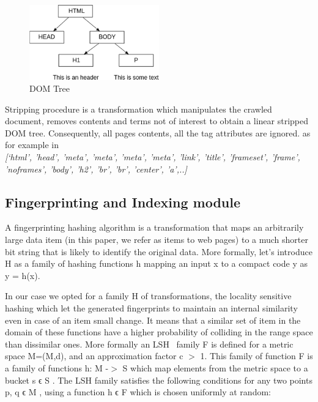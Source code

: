 \documentclass{easychair}
\begin{document}
\begin{figure}[ht]
  \begin{centering}
  \includegraphics[width=0.5\textwidth]{2.png}
  \caption{DOM Tree}
  \label{fig:DOM Tree}
  \end{centering}
\end{figure}

Stripping procedure is a transformation which manipulates the crawled document, removes contents and terms not of interest to obtain a linear stripped DOM tree. Consequently, all pages contents, all the tag attributes are ignored.  as for example in 
\\\textit{[‘html', 'head', 'meta', 'meta', 'meta', 'meta', 'link', 'title', 'frameset', 'frame', 'noframes', 'body', 'h2', 'br', 'br', 'center', 'a',..]}

\subsection{Fingerprinting and Indexing module}
\label{sect:Fingerprinting and Indexing module}

A fingerprinting hashing algorithm is a transformation that maps an arbitrarily large data item (in this paper, we refer as items to web pages) to a much shorter bit string that is likely to identify the original data. More formally, let’s introduce H as a family of hashing functions h mapping an input x to a compact code y as y = h(x).

In our case we opted for a family H of transformations, the locality sensitive hashing which let the generated fingerprints to maintain an internal similarity even in case of an item small change. It means that a similar set of item in the domain of these functions have a higher probability of colliding in the range space than dissimilar ones. More formally an LSH~\cite{lsh} family F is defined for a metric space M=(M,d), and an approximation factor c \begin{math} > \end{math} 1. This family of function F is a family of functions h: M -\begin{math} > \end{math} S which map elements from the metric space to a bucket s ϵ S . The LSH family satisfies the following conditions for any two points p, q ϵ M , using a function h ϵ F which is chosen uniformly at random:
\end{document}
